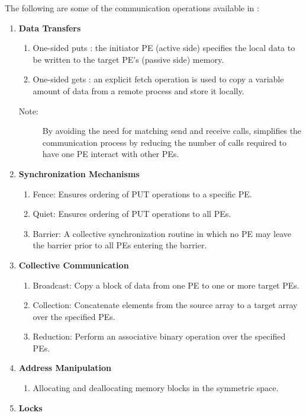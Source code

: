 \medskip{}
The following are some of the communication operations available in
\openshmem:
\begin{enumerate}
\item \textbf{Data Transfers }

\begin{enumerate}
\item One-sided puts : the initiator \ac{PE} (active side) specifies the local
data to be written to the target \ac{PE}'s (passive side) memory. 
\item One-sided gets : an explicit fetch operation is used to copy a variable
amount of data from a remote process and store it locally.\end{enumerate}
\begin{description}
\item [{{Note:}}] By avoiding the need for matching send and receive
calls, \openshmem simplifies the communication process by reducing the
number of calls required to have one \ac{PE} interact with other \ac{PE}s. 
\end{description}
\item \textbf{Synchronization Mechanisms }

\begin{enumerate}
\item Fence: Ensures ordering of PUT operations to a specific \ac{PE}. 
\item Quiet: Ensures ordering of PUT operations to all \ac{PE}s. 
\item Barrier: A collective synchronization routine in which no \ac{PE} may leave
the barrier prior to all \ac{PE}s entering the barrier. 
\end{enumerate}
\item \textbf{Collective Communication}

\begin{enumerate}
\item Broadcast: Copy a block of data from one \ac{PE} to one or more target
\ac{PE}s. 
\item Collection: Concatenate elements from the source array to a target
array over the specified \ac{PE}s. 
\item Reduction: Perform an associative binary operation over the specified
\ac{PE}s. 
\end{enumerate}
\item \textbf{Address Manipulation}

\begin{enumerate}
\item Allocating and deallocating memory blocks in the symmetric space.
\end{enumerate}
\item \textbf{Locks}


\end{enumerate}
